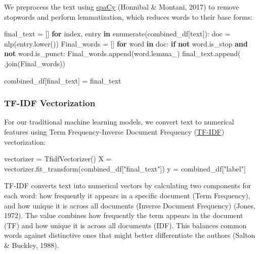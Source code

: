 \documentclass[
]{article}
\newenvironment{Shaded}{}{}
\newcommand{\BuiltInTok}[1]{\textcolor[rgb]{0.00,0.50,0.00}{#1}}
\newcommand{\ControlFlowTok}[1]{\textcolor[rgb]{0.00,0.44,0.13}{\textbf{#1}}}
\newcommand{\KeywordTok}[1]{\textcolor[rgb]{0.00,0.44,0.13}{\textbf{#1}}}
\newcommand{\NormalTok}[1]{#1}
\newcommand{\OperatorTok}[1]{\textcolor[rgb]{0.40,0.40,0.40}{#1}}
\newcommand{\StringTok}[1]{\textcolor[rgb]{0.25,0.44,0.63}{#1}}
\begin{document}
We preprocess the text using \href{https://spacy.io/}{spaCy} (Honnibal \& Montani, 2017) to remove stopwords and perform lemmatization, which reduces words to their base forms:

\begin{Shaded}
\begin{Highlighting}[]
\NormalTok{final\_text }\OperatorTok{=}\NormalTok{ []}
\ControlFlowTok{for}\NormalTok{ index, entry }\KeywordTok{in} \BuiltInTok{enumerate}\NormalTok{(combined\_df[}\StringTok{\textquotesingle{}text\textquotesingle{}}\NormalTok{]):}
\NormalTok{    doc }\OperatorTok{=}\NormalTok{ nlp(entry.lower())}
\NormalTok{    Final\_words }\OperatorTok{=}\NormalTok{ []}
    \ControlFlowTok{for}\NormalTok{ word }\KeywordTok{in}\NormalTok{ doc:}
        \ControlFlowTok{if} \KeywordTok{not}\NormalTok{ word.is\_stop }\KeywordTok{and} \KeywordTok{not}\NormalTok{ word.is\_punct:}
\NormalTok{            Final\_words.append(word.lemma\_)}
\NormalTok{    final\_text.append(}\StringTok{\textquotesingle{} \textquotesingle{}}\NormalTok{.join(Final\_words))}

\NormalTok{combined\_df[}\StringTok{\textquotesingle{}final\_text\textquotesingle{}}\NormalTok{] }\OperatorTok{=}\NormalTok{ final\_text}
\end{Highlighting}
\end{Shaded}

\subsubsection{TF-IDF Vectorization}\label{tf-idf-vectorization}

For our traditional machine learning models, we convert text to
numerical features using Term Frequency-Inverse Document Frequency
(\href{https://en.wikipedia.org/wiki/Tf–idf}{TF-IDF}) vectorization:

\begin{Shaded}
\begin{Highlighting}[]
\NormalTok{vectorizer }\OperatorTok{=}\NormalTok{ TfidfVectorizer()}
\NormalTok{X }\OperatorTok{=}\NormalTok{ vectorizer.fit\_transform(combined\_df[}\StringTok{"final\_text"}\NormalTok{])}
\NormalTok{y }\OperatorTok{=}\NormalTok{ combined\_df[}\StringTok{"label"}\NormalTok{]}
\end{Highlighting}
\end{Shaded}

TF-IDF converts text into numerical vectors by calculating two
components for each word: how frequently it appears in a specific
document (Term Frequency), and how unique it is across all documents
(Inverse Document Frequency) (Jones, 1972). The value combines how
frequently the term appears in the document (TF) and how unique it is
across all documents (IDF). This balances common words against
distinctive ones that might better differentiate the authors (Salton \&
Buckley, 1988).
\end{document}
